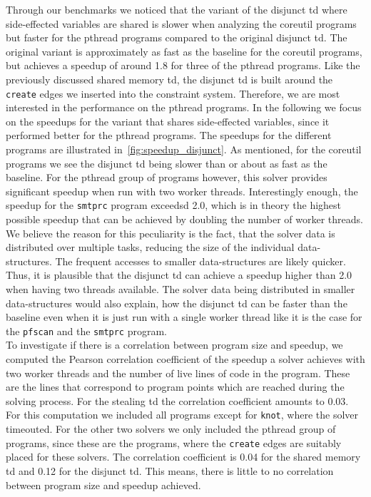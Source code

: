   Through our benchmarks we noticed that the variant of the disjunct \ac{td} where side-effected variables are shared is slower when analyzing the coreutil programs but faster for the pthread programs compared to the original disjunct \ac{td}. The original variant is approximately as fast as the baseline for the coreutil programs, but achieves a speedup of around 1.8 for three of the pthread programs.
  Like the previously discussed shared memory \ac{td}, the disjunct \ac{td} is built around the \texttt{create} edges we inserted into the constraint system. Therefore, we are most interested in the performance on the pthread programs. In the following we focus on the speedups for the variant that shares side-effected variables, since it performed better for the pthread programs. The speedups for the different programs are illustrated in~\autoref{fig:speedup_disjunct}. As mentioned, for the coreutil programs we see the disjunct \ac{td} being slower than or about as fast as the baseline. For the pthread group of programs however, this solver provides significant speedup when run with two worker threads. Interestingly enough, the speedup for the \texttt{smtprc} program exceedsd 2.0, which is in theory the highest possible speedup that can be achieved by doubling the number of worker threads. We believe the reason for this peculiarity is the fact, that the solver data is distributed over multiple tasks, reducing the size of the individual data-structures. The frequent accesses to smaller data-structures are likely quicker. Thus, it is plausible that the disjunct \ac{td} can achieve a speedup higher than 2.0 when having two threads available. The solver data being distributed in smaller data-structures would also explain, how the disjunct \ac{td} can be faster than the baseline even when it is just run with a single worker thread like it is the case for the \texttt{pfscan} and the \texttt{smtprc} program.\\
  To investigate if there is a correlation between program size and speedup, we computed the Pearson correlation coefficient of the speedup a solver achieves with two worker threads and the number of live lines of code in the program. These are the lines that correspond to program points which are reached during the solving process. For the stealing \ac{td} the correlation coefficient amounts to 0.03. For this computation we included all programs except for \texttt{knot}, where the solver timeouted. For the other two solvers we only included the pthread group of programs, since these are the programs, where the \texttt{create} edges are suitably placed for these solvers. The correlation coefficient is 0.04 for the shared memory \ac{td} and 0.12 for the disjunct \ac{td}. This means, there is little to no correlation between program size and speedup achieved.
